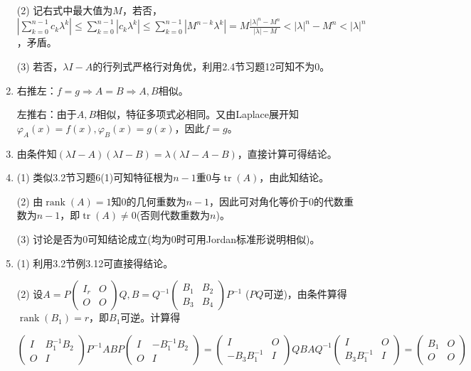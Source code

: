 \documentclass[a4paper,UTF8,fontset=windows]{ctexart}
\DeclareMathOperator{\rank}{rank}
\DeclareMathOperator{\tr}{tr}
\begin{document}
\begin{enumerate}
(2) 记右式中最大值为$M$，若否，$\left|\sum_{k=0}^{n-1}{c_k\lambda^k}\right|\le\sum_{k=0}^{n-1}|c_k\lambda^k|\le\sum_{k=0}^{n-1}|M^{n-k}\lambda^k|=M\frac{|\lambda|^n-M^n}{|\lambda|-M}<|\lambda|^n-M^n<|\lambda|^n$，矛盾。

(3) 若否，$\lambda I-A$的行列式严格行对角优，利用2.4节习题12可知不为0。

\item
右推左：$f=g\Rightarrow A=B\Rightarrow A,B$相似。

左推右：由于$A,B$相似，特征多项式必相同。又由Laplace展开知$\varphi_A(x)=f(x),\varphi_B(x)=g(x)$，因此$f=g$。

\item
由条件知$(\lambda I-A)(\lambda I-B)=\lambda(\lambda I-A-B)$，直接计算可得结论。

\item
(1) 类似3.2节习题6(1)可知特征根为$n-1$重0与$\tr(A)$，由此知结论。

(2) 由$\rank(A)=1$知0的几何重数为$n-1$，因此可对角化等价于0的代数重数为$n-1$，即$\tr(A)\ne0$(否则代数重数为$n$)。

(3) 讨论是否为0可知结论成立(均为0时可用Jordan标准形说明相似)。

\item
(1) 利用3.2节例3.12可直接得结论。

(2)
设$A=P\begin{pmatrix}I_r&O\\O&O\end{pmatrix}Q,B=Q^{-1}\begin{pmatrix}B_1&B_2\\B_3&B_4\end{pmatrix}P^{-1}$ ($PQ$可逆)，由条件算得$\rank(B_1)=r$，即$B_1$可逆。计算得

$\begin{pmatrix}I&B_1^{-1}B_2\\O&I\end{pmatrix}P^{-1}ABP\begin{pmatrix}I&-B_1^{-1}B_2\\O&I\end{pmatrix}=\begin{pmatrix}I&O\\-B_3B_1^{-1}&I\end{pmatrix}QBAQ^{-1}\begin{pmatrix}I&O\\B_3B_1^{-1}&I\end{pmatrix}=\begin{pmatrix}B_1&O\\O&O\end{pmatrix}$


\end{enumerate}
\end{document}
